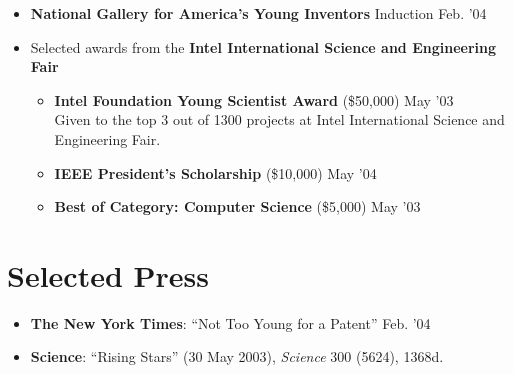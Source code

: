 \documentclass[margin]{res}
\begin{document}
\begin{resume}
\begin{itemize}[leftmargin=*]
\item {\bf National Gallery for America's Young Inventors} Induction \hfill Feb. '04

\item Selected awards from the {\bf Intel International Science and Engineering Fair}
\begin{itemize}[leftmargin=*] \itemsep -2pt



\item {\bf Intel Foundation Young Scientist Award} (\$50,000) \hfill May '03 \\Given to the top 3 out of 1300 projects at Intel International Science and Engineering Fair.
\item {\bf IEEE President's Scholarship} (\$10,000) \hfill May '04
\item {\bf Best of Category: Computer Science} (\$5,000) \hfill May '03
\end{itemize}
\end{itemize}

\section{Selected Press}
\begin{itemize}[leftmargin=*] \itemsep -2pt
\item \textbf{The New York Times}: ``Not Too Young for a Patent'' \hfill Feb. '04
\item \textbf{Science}: ``Rising Stars'' (30 May 2003), \textit{Science} 300 (5624), 1368d.

\end{itemize}


\end{resume}
\end{document}
